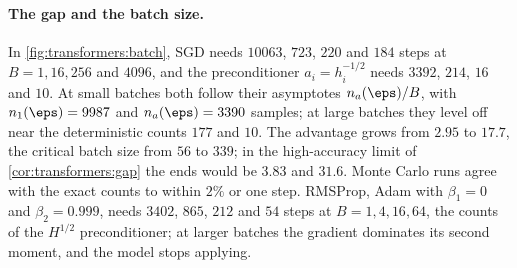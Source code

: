 \begin{refsection}
\paragraph{The gap and the batch size.} In \cref{fig:transformers:batch}, SGD needs $10063$, $723$, $220$ and $184$ steps at $B=1,16,256$ and $4096$, and the preconditioner $a_i=h_i^{-1/2}$ needs $3392$, $214$, $16$ and $10$. At small batches both follow their asymptotes $n_a(\eps)/B$, with $n_1(\eps)=9987$ and $n_a(\eps)=3390$ samples; at large batches they level off near the deterministic counts $177$ and $10$. The advantage grows from $2.95$ to $17.7$, the critical batch size from $56$ to $339$; in the high-accuracy limit of \cref{cor:transformers:gap} the ends would be $3.83$ and $31.6$. Monte Carlo runs agree with the exact counts to within $2\%$ or one step. RMSProp, Adam with $\beta_1=0$ and $\beta_2=0.999$, needs $3402$, $865$, $212$ and $54$ steps at $B=1,4,16,64$, the counts of the $H^{1/2}$ preconditioner; at larger batches the gradient dominates its second moment, and the model stops applying.


\end{refsection}
